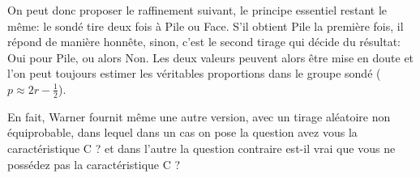 \documentclass[a4paper,11pt]{article} %
\begin{document}
On peut donc proposer le raffinement suivant, le principe essentiel restant le même: le sondé tire deux fois à \og Pile ou Face\fg{}. S'il obtient \og Pile \fg{} la première fois, il répond de manière honnête, sinon, c'est le second tirage qui décide du résultat: \og Oui\fg{} pour \og Pile\fg{}, ou alors \og Non\fg{}. 
Les deux valeurs peuvent alors être mise en doute et l'on peut toujours estimer les véritables proportions dans le groupe sondé ($p\approx2r-\frac{1}{2}$).
\begin{center}
\end{center}
En fait, Warner fournit même une autre version, avec un tirage aléatoire non équiprobable, dans lequel dans un cas on pose la question \og avez vous la caractéristique C ?\fg{} et dans l'autre la question contraire \og est-il vrai que vous ne possédez pas la caractéristique C ?\fg{}
\end{document}
